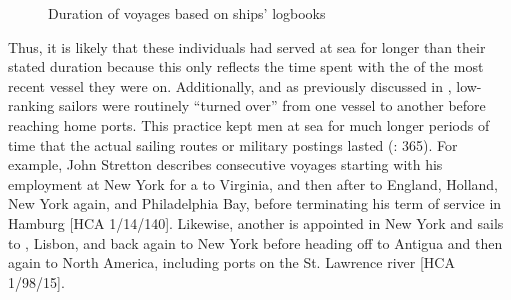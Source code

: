 \begin{figure}[t]

\caption[Duration of voyages based on ships’ logbooks]{\label{fig:key:4.3} Duration of voyages based on ships’ logbooks\\
}
\end{figure}


\largerpage
Thus, it is likely that these individuals had served at sea for longer than their stated duration because this only reflects the time spent with the  of the most recent vessel they were on. Additionally, and as previously discussed in , low-ranking sailors were routinely “turned over” from one vessel to another before reaching home ports. This practice kept men at sea for much longer periods of time that the actual sailing routes or military postings lasted (\citealt{AdkinsAdkins2008}: 365). For example, John Stretton describes consecutive voyages starting with his employment at New York for a  to Virginia, and then after to England, Holland, New York again, and Philadelphia Bay, before terminating his term of service in Hamburg [HCA 1/14/140]. Likewise, another  is appointed in New York and sails to , Lisbon, and back again to New York before heading off to Antigua and then again to North America, including ports on the St. Lawrence river [HCA 1/98/15]. 

